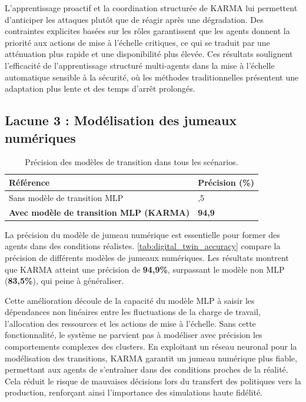 L'apprentissage proactif et la coordination structurée de KARMA lui permettent d'anticiper les attaques plutôt que de réagir après une dégradation. Des contraintes explicites basées sur les rôles garantissent que les agents donnent la priorité aux actions de mise à l'échelle critiques, ce qui se traduit par une atténuation plus rapide et une disponibilité plus élevée. Ces résultats soulignent l'efficacité de l'apprentissage structuré multi-agents dans la mise à l'échelle automatique sensible à la sécurité, où les méthodes traditionnelles présentent une adaptation plus lente et des temps d'arrêt prolongés.


\subsection{Lacune 3 : Modélisation des jumeaux numériques}

\begin{table}[h]
    \centering
    \caption{Précision des modèles de transition dans tous les scénarios.}
    \label{tab:digital_twin_accuracy}{
        \footnotesize
    \begin{tabular}{>{\raggedright\arraybackslash}m{6cm}>{\centering\arraybackslash}m{2cm}}
        \hline
        \textbf{Référence} & \textbf{Précision (\%)} \\
        \hline
        Sans modèle de transition MLP & 83,5 \\
        \textbf{Avec modèle de transition MLP (KARMA)} & \textbf{94,9} \\
        \hline
    \end{tabular}}
\end{table}
%
La précision du modèle de jumeau numérique est essentielle pour former des agents dans des conditions réalistes.
\autoref{tab:digital_twin_accuracy} compare la précision de différents modèles de jumeaux numériques. Les résultats montrent que KARMA atteint une précision de \textbf{94,9\%}, surpassant le modèle non MLP (\textbf{83,5\%}), qui peine à généraliser.

Cette amélioration découle de la capacité du modèle MLP à saisir les dépendances non linéaires entre les fluctuations de la charge de travail, l'allocation des ressources et les actions de mise à l'échelle. Sans cette fonctionnalité, le système ne parvient pas à modéliser avec précision les comportements complexes des clusters.
%
En exploitant un réseau neuronal pour la modélisation des transitions, KARMA garantit un jumeau numérique plus fiable, permettant aux agents de s'entraîner dans des conditions proches de la réalité. Cela réduit le risque de mauvaises décisions lors du transfert des politiques vers la production, renforçant ainsi l'importance des simulations haute fidélité.



